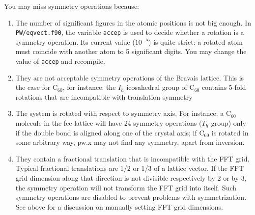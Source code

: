 \documentclass[12pt]{article}
\begin{document}
\begin{itemize}
      You may miss symmetry operations because:
      \begin{enumerate}
      \item
      The number of significant figures in the atomic positions
         is not big enough. In {\tt PW/eqvect.f90}, the variable
         {\tt accep} is used to decide whether a rotation is a
         symmetry operation. Its current value ($10^{-5}$) is quite
         strict: a rotated atom must coincide with another atom to 5
         significant digits. You may change the value of {\tt accep}
         and recompile.
      \item
       They are not acceptable symmetry operations of the Bravais 
         lattice. This is the case for C$_{60}$, for instance:
         the $I_h$ icosahedral group of C$_{60}$ contains 5-fold
         rotations that are incompatible with translation symmetry
      \item
       The system is rotated with respect to symmetry axis.
         For instance: a C$_{60}$ molecule in the fcc lattice will
         have 24 symmetry operations ($T_h$ group) only if the double
         bond is aligned  along one of the crystal axis; if C$_{60}$
         is rotated in some arbitrary way, pw.x may not find any
         symmetry, apart from inversion.
      \item
       They contain a fractional translation that is incompatible
         with the FFT grid. Typical fractional translations are 1/2 or 1/3
         of a lattice vector. If the FFT grid dimension along that
         direction is not divisible respectively by 2 or by 3, the 
         symmetry operation will not transform the FFT grid into itself.
         Such symmetry operations are disabled to prevent problems with 
         symmetrization. See above for a discussion on manually setting
         FFT grid dimensions.


\end{enumerate}
\end{itemize}
\end{document}
